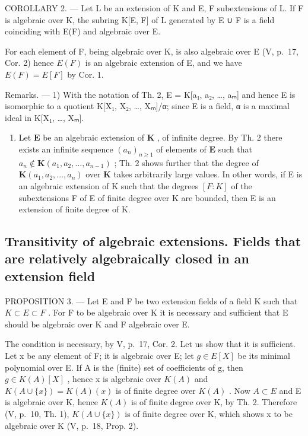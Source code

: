 COROLLARY 2. --- Let L be an extension of K and E, F subextensions of L. If F is algebraic over K, the subring K{[}E, F{]} of L generated by E ∪ F is a field coinciding with E(F) and algebraic over E.

For each element of F, being algebraic over K, is also algebraic over E (V, p.~17, Cor. 2) hence \(E(F)\) is an algebraic extension of E, and we have \(E(F) = E[F]\) by Cor. 1.

Remarks. --- 1) With the notation of Th. 2, E = K{[}a₁, a₂, \ldots, aₘ{]} and hence E is isomorphic to a quotient K{[}X₁, X₂, \ldots, Xₘ{]}/α; since E is a field, α is a maximal ideal in K{[}X₁, \ldots, Xₘ{]}.

\begin{enumerate}
\def\labelenumi{\arabic{enumi})}
\setcounter{enumi}{1}
\tightlist
\item
  Let \(\mathbf{E}\) be an algebraic extension of \(\mathbf{K}\) , of infinite degree. By Th. 2 there exists an infinite sequence \((a_n)_{n \geq 1}\) of elements of \(\mathbf{E}\) such that \(a_n \notin \mathbf{K}(a_1, a_2, \ldots, a_{n-1})\) ; Th. 2 shows further that the degree of \(\mathbf{K}(a_1, a_2, \ldots, a_n)\) over \(\mathbf{K}\) takes arbitrarily large values. In other words, if E is an algebraic extension of K such that the degrees \([F:K]\) of the subextensions F of E of finite degree over K are bounded, then E is an extension of finite degree of K.
\end{enumerate}

\subsection{Transitivity of algebraic extensions. Fields that are relatively algebraically closed in an extension field}

PROPOSITION 3. --- Let E and F be two extension fields of a field K such that \(K \subset E \subset F\) . For F to be algebraic over K it is necessary and sufficient that E should be algebraic over K and F algebraic over E.

The condition is necessary, by V, p.~17, Cor. 2. Let us show that it is sufficient. Let x be any element of F; it is algebraic over E; let \(g \in E[X]\) be its minimal polynomial over E. If A is the (finite) set of coefficients of g, then \(g \in K(A)[X]\) , hence x is algebraic over \(K(A)\) and \(K(A \cup \{x\}) = K(A)(x)\) is of finite degree over \(K(A)\) . Now \(A \subset E\) and E is algebraic over K, hence \(K(A)\) is of finite degree over K, by Th. 2. Therefore (V, p.~10, Th. 1), \(K(A \cup \{x\})\) is of finite degree over K, which shows x to be algebraic over K (V, p.~18, Prop. 2).

